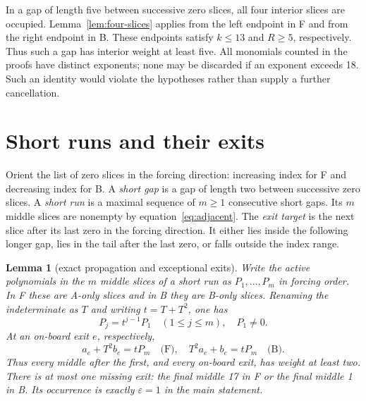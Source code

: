 \documentclass{article}
\newtheorem{lemma}{Lemma}
\begin{document}
In a gap of length five between successive zero slices, all four interior
slices are occupied. Lemma~\ref{lem:four-slices} applies from the left endpoint in F and from
the right endpoint in B. These endpoints satisfy \(k \le 13\) and \(R \ge 5\),
respectively. Thus such a gap has interior weight at least five.
All monomials counted in the proofs have distinct exponents; none may be
discarded if an exponent exceeds 18. Such an identity would violate the
hypotheses rather than supply a further cancellation.

\section{Short runs and their exits}\label{sec:runs}

Orient the list of zero slices in the forcing direction: increasing index
for F and decreasing index for B. A \emph{short gap} is a gap of length two
between successive zero slices. A \emph{short run} is a maximal sequence of
\(m \ge 1\) consecutive short gaps. Its \(m\) middle slices are nonempty by
equation~\eqref{eq:adjacent}. The \emph{exit target} is the next slice after its last zero in
the forcing direction. It either lies inside the following longer gap, lies
in the tail after the last zero, or falls outside the index range.

\begin{lemma}[exact propagation and exceptional exits]\label{lem:run-propagation}
  Write the active
  polynomials in the \(m\) middle slices of a short run as \(P_1, \dots, P_m\) in
  forcing order. In F these are A-only slices and in B they are B-only slices.
  Renaming the indeterminate as \(T\) and writing \(t = T + T^2\), one has
  \begin{equation}\label{eq:run-powers}
    P_j = t^{j-1} P_1 \quad (1 \le j \le m), \quad P_1 \ne 0.
  \end{equation}
  At an on-board exit \(e\), respectively,
  \begin{equation}\label{eq:exit-feed}
    a_e + T^2 b_e = t P_m \quad \text{(F)}, \quad
    T^2 a_e + b_e = t P_m \quad \text{(B)}.
  \end{equation}
  Thus every middle after the first, and every on-board exit, has weight at
  least two. There is at most one missing exit: the final middle 17 in F or
  the final middle 1 in B. Its occurrence is exactly \(\varepsilon = 1\) in the main
  statement.
\end{lemma}
\end{document}
